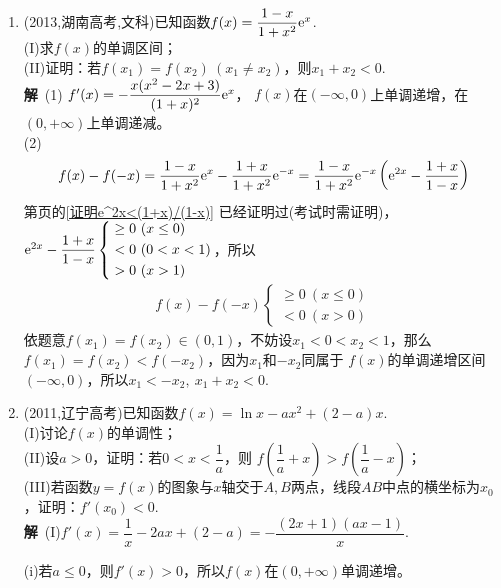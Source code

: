 \begin{enumerate}[label={\textbf{\arabic*.}},leftmargin=
    \inteval{\myenumleftmargin}pt]
\item (2013,湖南高考,文科)已知函数$ f(x)=\dfrac{1-x}{1+x^2}\mathrm{e}^x $.\\
(I)求$ f(x) $的单调区间；\\
(II)证明：若$ f(x_1)=f(x_2)\ (x_1\neq x_2) $，则$ x_1+x_2<0 $. \\
\textbf{解}\ (1) $ f'(x)=-\dfrac{x(x^2-2x+3)}{(1+x)^2}\mathrm{e}^x $，
$ f(x) $在$ (-\infty,0) $上单调递增，在$ (0,+\infty) $上单调递减。\\
(2) 
\begin{align*}
    f(x)-f(-x)=\dfrac{1-x}{1+x^2}\mathrm{e}^x-\dfrac{1+x}{1+x^2}\mathrm{e}^{-x}=
    \dfrac{1-x}{1+x^2}\mathrm{e}^{-x}\left(\mathrm{e}^{2x}-\dfrac{1+x}{1-x}\right)
\end{align*}
第\pageref{证明e^2x<(1+x)/(1-x)}页的\ref{证明e^2x<(1+x)/(1-x)}
已经证明过(考试时需证明)，$ \mathrm{e}^{2x}-\dfrac{1+x}{1-x}
\left\{\begin{aligned}
    & \geq 0\ (x\leq 0) \\
    & < 0\ (0<x<1) \\
    & > 0\ (x>1)
\end{aligned}\right. $，所以
\begin{gather*}
    f(x)-f(-x) \begin{cases}
        \geq 0\ (x\leq 0) \\
        <0 \ (x>0) 
    \end{cases}
\end{gather*}
依题意$ f(x_1)=f(x_2)\in (0,1) $，不妨设$ x_1<0<x_2<1 $，那么
$ f(x_1)=f(x_2)<f(-x_2) $，因为$ x_1 $和$ -x_2 $同属于
$ f(x) $的单调递增区间$ (-\infty,0) $，所以$ x_1<-x_2,\ x_1+x_2<0 $.

\item (2011,辽宁高考)已知函数$ f(x)=\ln x-ax^2+(2-a)x $.\\
(I)讨论$ f(x) $的单调性；\\
(II)设$ a>0 $，证明：若$ 0<x<\dfrac{1}{a} $，则
$ f\left(\dfrac{1}{a}+x\right)>f\left(\dfrac{1}{a}-x\right) $；\\
(III)若函数$ y=f(x) $的图象与$ x $轴交于$ A,B $两点，线段$ AB $中点的横坐标为$ x_0 $，证明：$ f'(x_0)<0 $. \\
\textbf{解}\ (I)$ f'(x)=\dfrac{1}{x}-2ax+(2-a)=-\dfrac{(2x+1)(ax-1)}{x} $. 

(i)若$a\leqslant 0$，则$f'(x)>0$，所以$f(x)$在$(0,+\infty)$单调递增。


\end{enumerate}
